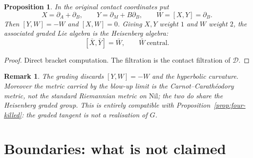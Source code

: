 \documentclass[11pt]{article}
\newtheorem{proposition}[theorem]{Proposition}
\newtheorem{remark}[theorem]{Remark}
\begin{document}
\begin{proposition}
\label{prop:nil-tangent}
In the original contact coordinates put
\[
X=\partial_A+\partial_B,\qquad Y=\partial_M+B\partial_B,\qquad W=[X,Y]=\partial_B .
\]
Then $[Y,W]=-W$ and $[X,W]=0$. Giving $X,Y$ weight $1$ and $W$ weight $2$, the
associated graded Lie algebra is the Heisenberg algebra:
\[
[\bar X,\bar Y]=\bar W,\qquad \bar W\ \text{central}.
\]
\end{proposition}

\begin{proof}
Direct bracket computation. The filtration is the contact filtration of
$\mathcal D$.
\end{proof}

\begin{remark}
The grading discards $[Y,W]=-W$ and the hyperbolic curvature. Moreover the
metric carried by the blow-up limit is the Carnot--Carath\'eodory metric, not the
standard Riemannian metric on $\mathrm{Nil}$; the two do share the Heisenberg
graded group. This is entirely compatible with
Proposition~\ref{prop:four-killed}: the graded tangent is not a realisation of
$G$.
\end{remark}

\section{Boundaries: what is not claimed}
\label{sec:boundaries}
\end{document}
